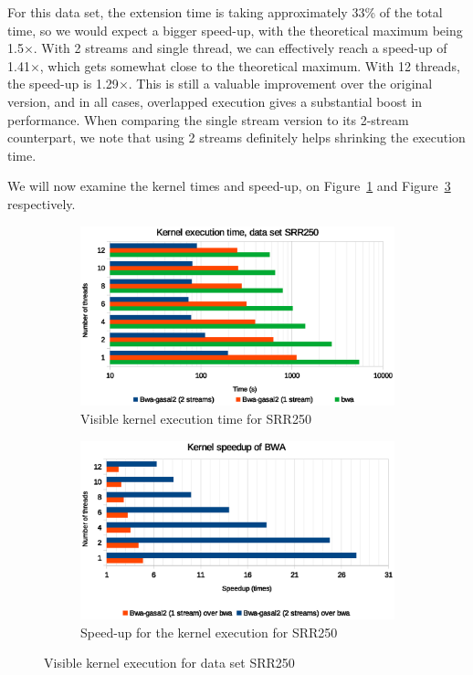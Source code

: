 For this data set, the extension time is taking approximately 33\% of the total time, so we would expect a bigger speed-up, with the theoretical maximum being 1.5$\times$. With 2 streams and single thread, we can effectively reach a speed-up of 1.41$\times$, which gets somewhat close to the theoretical maximum. With 12 threads, the speed-up is 1.29$\times$. This is still a valuable improvement over the original version, and in all cases, overlapped execution gives a substantial boost in performance. When comparing the single stream version to its 2-stream counterpart, we note that using 2 streams definitely helps shrinking the execution time.

We will now examine the kernel times and speed-up, on Figure~\ref{fig:kernel-exec-time-srr250} and Figure~\ref{fig:kernel-exec-speed-up-srr250} respectively.


\begin{figure}[p]
	\centering
	\begin{subfigure}[t]{1\textwidth}
		\centering
		\includegraphics[width=1\textwidth]{srr250/kernel-exec-time-srr250}
		\caption{Visible kernel execution time for SRR250}
		\label{fig:kernel-exec-time-srr250}
	\end{subfigure}%
	
	\begin{subfigure}[b]{1\textwidth}
		\centering
		\includegraphics[width=1\textwidth]{srr250/kernel-exec-speed-up-srr250}
		\caption{Speed-up for the kernel execution for SRR250}
		\label{fig:kernel-exec-speed-up-srr250}
	\end{subfigure}
	\caption{Visible kernel execution for data set SRR250}
\end{figure}

